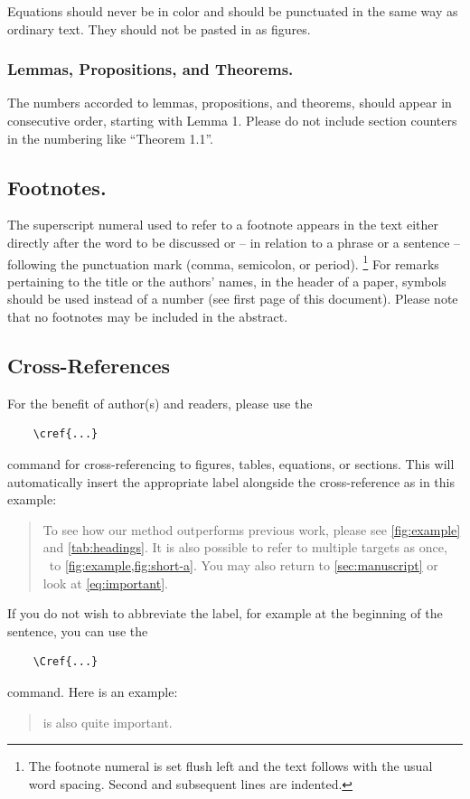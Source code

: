 \documentclass[runningheads]{llncs}
\begin{document}
Equations should never be in color and should be punctuated in the same way as ordinary text.
They should not be pasted in as figures.


\subsubsection{Lemmas, Propositions, and Theorems.}
The numbers accorded to lemmas, propositions, and theorems, \etc should appear in consecutive order, starting with Lemma 1. 
Please do not include section counters in the numbering like ``Theorem 1.1''.


\subsection{Footnotes.}
The superscript numeral used to refer to a footnote appears in the text either directly after the word to be discussed or -- in relation to a phrase or a sentence -- following the punctuation mark (comma, semicolon, or period).%
\footnote{The footnote numeral is set flush left and the text follows with the usual word spacing. 
  Second and subsequent lines are indented. 
}
For remarks pertaining to the title or the authors' names, in the header of a paper, symbols should be used instead of a number (see first page of this document). 
Please note that no footnotes may be included in the abstract.


\subsection{Cross-References}
For the benefit of author(s) and readers, please use the
{\small
  \begin{verbatim}
    \cref{...}
  \end{verbatim}
}
command for cross-referencing to figures, tables, equations, or sections.
This will automatically insert the appropriate label alongside the cross-reference as in this example:
\begin{quotation}
  To see how our method outperforms previous work, please see \cref{fig:example} and \cref{tab:headings}.
  It is also possible to refer to multiple targets as once, \eg~to \cref{fig:example,fig:short-a}.
  You may also return to \cref{sec:manuscript} or look at \cref{eq:important}.
\end{quotation}
If you do not wish to abbreviate the label, for example at the beginning of the sentence, you can use the
{\small
  \begin{verbatim}
    \Cref{...}
  \end{verbatim}
}
command. Here is an example:
\begin{quotation}
   is also quite important.
\end{quotation}
\end{document}
